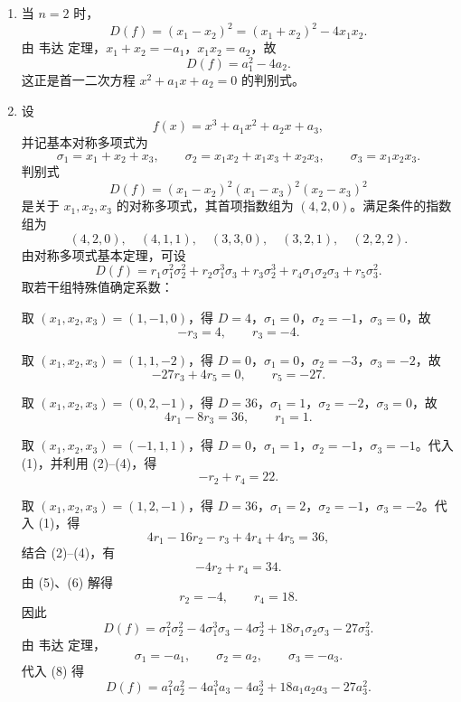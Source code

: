 \begin{solution}
	\begin{enumerate}
		\item 当 \(n=2\) 时，
		\[
		D(f)=(x_1-x_2)^2=(x_1+x_2)^2-4x_1x_2.
		\]
		由 韦达 定理，\(x_1+x_2=-a_1\)，\(x_1x_2=a_2\)，故
		\[
		D(f)=a_1^2-4a_2.
		\]
		这正是首一二次方程 \(x^2+a_1x+a_2=0\) 的判别式。
		
		\item 设
		\[
		f(x)=x^3+a_1x^2+a_2x+a_3,
		\]
		并记基本对称多项式为
		\[
		\sigma_1=x_1+x_2+x_3,
		\qquad \sigma_2=x_1x_2+x_1x_3+x_2x_3,
		\qquad \sigma_3=x_1x_2x_3.
		\]
		判别式
		\[
		D(f)=(x_1-x_2)^2(x_1-x_3)^2(x_2-x_3)^2
		\]
		是关于 \(x_1,x_2,x_3\) 的对称多项式，其首项指数组为 \((4,2,0)\)。满足条件的指数组为
		\[
		(4,2,0),\quad(4,1,1),\quad(3,3,0),\quad(3,2,1),\quad(2,2,2).
		\]
		由对称多项式基本定理，可设
		\begin{equation}
			D(f)=r_1\sigma_1^2\sigma_2^2+r_2\sigma_1^3\sigma_3
			+r_3\sigma_2^3+r_4\sigma_1\sigma_2\sigma_3+r_5\sigma_3^2.
			\tag{1}
		\end{equation}
		取若干组特殊值确定系数：
		
		取 \((x_1,x_2,x_3)=(1,-1,0)\)，得 \(D=4\)，\(\sigma_1=0\)，\(\sigma_2=-1\)，\(\sigma_3=0\)，故
		\begin{equation}
			-r_3=4,
			\qquad r_3=-4.
			\tag{2}
		\end{equation}
		
		取 \((x_1,x_2,x_3)=(1,1,-2)\)，得 \(D=0\)，\(\sigma_1=0\)，\(\sigma_2=-3\)，\(\sigma_3=-2\)，故
		\begin{equation}
			-27r_3+4r_5=0,
			\qquad r_5=-27.
			\tag{3}
		\end{equation}
		
		取 \((x_1,x_2,x_3)=(0,2,-1)\)，得 \(D=36\)，\(\sigma_1=1\)，\(\sigma_2=-2\)，\(\sigma_3=0\)，故
		\begin{equation}
			4r_1-8r_3=36,
			\qquad r_1=1.
			\tag{4}
		\end{equation}
		
		取 \((x_1,x_2,x_3)=(-1,1,1)\)，得 \(D=0\)，\(\sigma_1=1\)，\(\sigma_2=-1\)，\(\sigma_3=-1\)。代入 (1)，并利用 (2)--(4)，得
		\begin{equation}
			-r_2+r_4=22.
			\tag{5}
		\end{equation}
		
		取 \((x_1,x_2,x_3)=(1,2,-1)\)，得 \(D=36\)，\(\sigma_1=2\)，\(\sigma_2=-1\)，\(\sigma_3=-2\)。代入 (1)，得
		\[
		4r_1-16r_2-r_3+4r_4+4r_5=36,
		\]
		结合 (2)--(4)，有
		\begin{equation}
			-4r_2+r_4=34.
			\tag{6}
		\end{equation}
		由 (5)、(6) 解得
		\begin{equation}
			r_2=-4,
			\qquad r_4=18.
			\tag{7}
		\end{equation}
		因此
		\begin{equation}
			D(f)=\sigma_1^2\sigma_2^2-4\sigma_1^3\sigma_3-4\sigma_2^3
			+18\sigma_1\sigma_2\sigma_3-27\sigma_3^2.
			\tag{8}
		\end{equation}
		由 韦达 定理，
		\[
		\sigma_1=-a_1,
		\qquad \sigma_2=a_2,
		\qquad \sigma_3=-a_3.
		\]
		代入 (8) 得
		\[
		D(f)=a_1^2a_2^2-4a_1^3a_3-4a_2^3+18a_1a_2a_3-27a_3^2.
		\]
		

\end{enumerate}
\end{solution}
